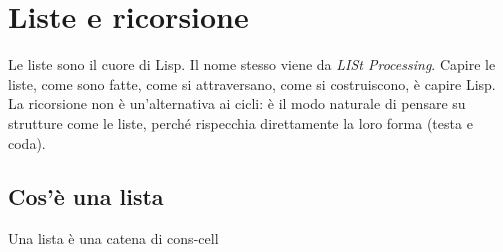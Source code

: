 
\chapter{Liste e ricorsione}

\begin{intuizione}
Le liste sono il cuore di Lisp. Il nome stesso viene da
\textit{LISt Processing}. Capire le liste, come sono fatte,
come si attraversano, come si costruiscono, è capire Lisp.
La ricorsione non è un'alternativa ai cicli: è il modo naturale
di pensare su strutture come le liste, perché rispecchia direttamente
la loro forma (testa e coda).
\end{intuizione}

\vspace{4pt}

\section{Cos'è una lista}

\begin{concetto}{Una lista è una catena di cons-cell}

\end{concetto}

